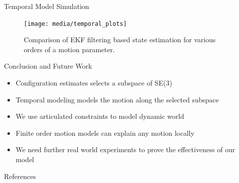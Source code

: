 \documentclass[final]{beamer}
\newlength{\sepwid}
\newlength{\onecolwid}
\begin{document}
\begin{frame}[t]
\begin{columns}[t]

  \hspace{-\sepwid}
    \begin{column}{\onecolwid}

      \begin{block}{Temporal Model Simulation}
        \centering
          \begin{figure}
            \texttt{[image: media/temporal\_plots]}
            \caption{Comparison of EKF filtering based state estimation for
	    various orders of a motion parameter.}
          \end{figure}
      \end{block}

      \begin{block}{Conclusion and Future Work}
        \begin{itemize}
		\item Configuration estimates selects a subspace of SE(3)
		\item Temporal modeling models the motion along the selected
			subspace
		\item We use articulated constraints to model dynamic world
		\item Finite order motion models can explain any motion locally
		\item We need further real world experiments to prove the effectiveness of our model
        \end{itemize}
      \end{block}
      \begin{block}{References}
        \nocite{yaakov2001estimation}
        \nocite{cifuentes2012motion}
        \nocite{yan2006automatic}
        {\small
        
        
        }
      \end{block}
    \end{column}

  \begin{column}{\sepwid}\end{column}			%

  \end{columns}
\end{frame}
\end{document}
